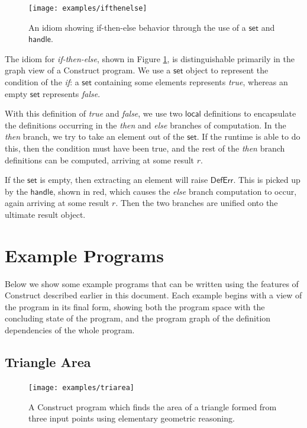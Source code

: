 \documentclass[twoside,openright,11pt]{report}
\begin{document}
\begin{figure}[h]
  \centering
  \texttt{[image: examples/ifthenelse]}
  \caption{An idiom showing if-then-else behavior through the use of a $\mathsf{set}$ and $\mathsf{handle}$.}
  \label{fig:ifthenelse}
\end{figure}

The idiom for {\it if-then-else}, shown in Figure \ref{fig:ifthenelse}, is distinguishable primarily in the graph view of a Construct program.
We use a $\mathsf{set}$ object to represent the condition of the {\it if}: a $\mathsf{set}$ containing some elements represents {\it true}, whereas an empty $\mathsf{set}$ represents {\it false}.

With this definition of {\it true} and {\it false}, we use two $\mathsf{local}$ definitions to encapsulate the definitions occurring in the {\it then} and {\it else} branches of computation. 
In the {\it then} branch, we try to take an element out of the $\mathsf{set}$. 
If the runtime is able to do this, then the condition must have been true, and the rest of the {\it then} branch definitions can be computed, arriving at some result $r$.

If the $\mathsf{set}$ is empty, then extracting an element will raise $\mathsf{DefErr}$. 
This is picked up by the $\mathsf{handle}$, shown in red, which causes the {\it else} branch computation to occur, again arriving at some result $r$.
Then the two branches are unified onto the ultimate result object.

\section{Example Programs}
\label{sec:example}

Below we show some example programs that can be written using the features of Construct described earlier in this document. 
Each example begins with a view of the program in its final form, showing both the program space with the concluding state of the program, and the program graph of the definition dependencies of the whole program.

\pagebreak

\subsection{Triangle Area}
\label{subsec:triarea}

\begin{figure}[h]
  \centering
  \texttt{[image: examples/triarea]}
  \caption{A Construct program which finds the area of a triangle formed from three input points using elementary geometric reasoning.}
  \label{fig:triarea}
\end{figure}
\end{document}
